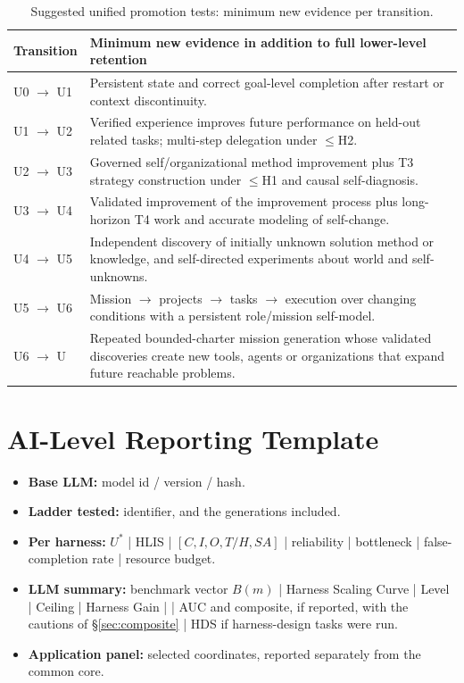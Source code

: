 \begin{table}[!htbp]
\centering\small
\begin{tabularx}{\textwidth}{@{}lY@{}}
\toprule
Transition & Minimum new evidence in addition to full lower-level retention \\
\midrule
U0 $\to$ U1 & Persistent state and correct goal-level completion after restart or context discontinuity. \\
U1 $\to$ U2 & Verified experience improves future performance on held-out related tasks; multi-step delegation under $\le$H2. \\
U2 $\to$ U3 & Governed self/organizational method improvement plus T3 strategy construction under $\le$H1 and causal self-diagnosis. \\
U3 $\to$ U4 & Validated improvement of the improvement process plus long-horizon T4 work and accurate modeling of self-change. \\
U4 $\to$ U5 & Independent discovery of initially unknown solution method or knowledge, and self-directed experiments about world and self-unknowns. \\
U5 $\to$ U6 & Mission $\to$ projects $\to$ tasks $\to$ execution over changing conditions with a persistent role/mission self-model. \\
U6 $\to$ U\Om{} & Repeated bounded-charter mission generation whose validated discoveries create new tools, agents or organizations that expand future reachable problems. \\
\bottomrule
\end{tabularx}
\caption{Suggested unified promotion tests: minimum new evidence per transition.}
\label{tab:promotion}
\end{table}

\section{AI-Level Reporting Template}

\begin{itemize}
\item \textbf{Base LLM:} model id / version / hash.
\item \textbf{Ladder tested:} identifier, and the generations included.
\item \textbf{Per harness:} $U^{*}$ | HLIS | $[C,I,O,T/H,SA]$ | reliability | bottleneck | false-completion rate | resource budget.
\item \textbf{LLM summary:} benchmark vector $B(m)$ | Harness Scaling Curve | Level | Ceiling | Harness Gain | \rhov{} | AUC and composite, if reported, with the cautions of \S\ref{sec:composite} | HDS if harness-design tasks were run.
\item \textbf{Application panel:} selected coordinates, reported separately from the common core.
\end{itemize}

